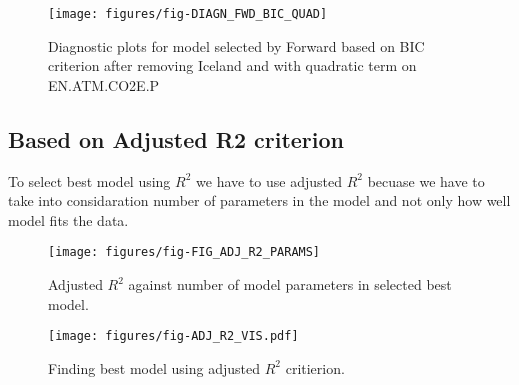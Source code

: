 \documentclass[a4paper]{article}
\begin{document}
\begin{figure}[H]
\begin{center}
\texttt{[image: figures/fig-DIAGN\_FWD\_BIC\_QUAD]}
\caption{Diagnostic plots for model selected by Forward based on BIC criterion after removing Iceland
and with quadratic term on EN.ATM.CO2E.P}
\end{center}
\end{figure}


\subsection{Based on Adjusted R2 criterion}
To select best model using $R^2$ we have to use adjusted $R^2$ becuase we have
to take into considaration number of parameters in the model and not only how
well model fits the data.

\begin{figure}[H]
\begin{center}
\texttt{[image: figures/fig-FIG\_ADJ\_R2\_PARAMS]}
\caption{Adjusted $R^2$ against number of model parameters in selected best
model.}
\end{center}
\end{figure}

\begin{figure}[H]
\begin{center}
\advance\rightskip-0.5cm
\advance\leftskip-1cm
\texttt{[image: figures/fig-ADJ\_R2\_VIS.pdf]}
\caption{Finding best model using adjusted $R^2$ critierion.}
\end{center}
\end{figure}
\end{document}
